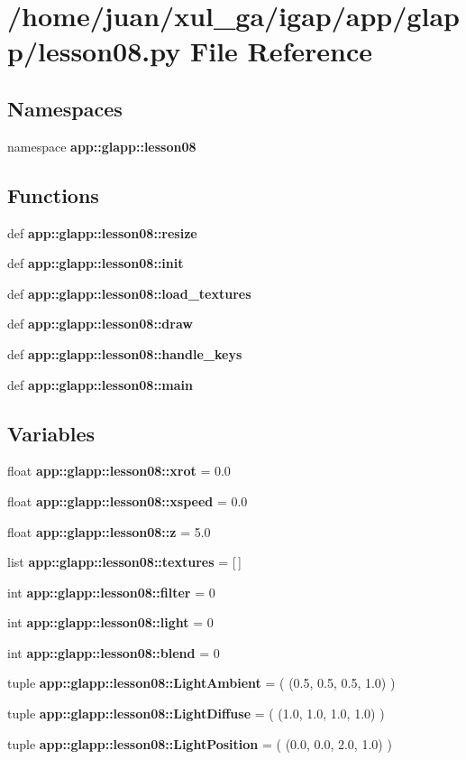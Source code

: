 \section{/home/juan/xul\_\-ga/igap/app/glapp/lesson08.py File Reference}
\label{lesson08_8py}
\subsection*{Namespaces}
\begin{CompactItemize}
\item 
namespace {\bf app::glapp::lesson08}
\end{CompactItemize}
\subsection*{Functions}
\begin{CompactItemize}
\item 
def {\bf app::glapp::lesson08::resize}
\item 
def {\bf app::glapp::lesson08::init}
\item 
def {\bf app::glapp::lesson08::load\_\-textures}
\item 
def {\bf app::glapp::lesson08::draw}
\item 
def {\bf app::glapp::lesson08::handle\_\-keys}
\item 
def {\bf app::glapp::lesson08::main}
\end{CompactItemize}
\subsection*{Variables}
\begin{CompactItemize}
\item 
float {\bf app::glapp::lesson08::xrot} = 0.0
\item 
float {\bf app::glapp::lesson08::xspeed} = 0.0
\item 
float {\bf app::glapp::lesson08::z} = 5.0
\item 
list {\bf app::glapp::lesson08::textures} = [$\,$]
\item 
int {\bf app::glapp::lesson08::filter} = 0
\item 
int {\bf app::glapp::lesson08::light} = 0
\item 
int {\bf app::glapp::lesson08::blend} = 0
\item 
tuple {\bf app::glapp::lesson08::LightAmbient} = ( (0.5, 0.5, 0.5, 1.0) )
\item 
tuple {\bf app::glapp::lesson08::LightDiffuse} = ( (1.0, 1.0, 1.0, 1.0) )
\item 
tuple {\bf app::glapp::lesson08::LightPosition} = ( (0.0, 0.0, 2.0, 1.0) )
\end{CompactItemize}
